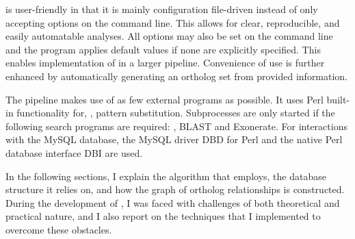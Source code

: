 \pname is user-friendly in that it is mainly configuration file-driven instead
of only accepting options on the command line. This allows for clear,
reproducible, and easily automatable analyses. All options may also be set on
the command line and the program applies default values if none are explicitly
specified. This enables implementation of \pname in a larger pipeline.
Convenience of use is further enhanced by automatically generating an ortholog
set from provided information.

The pipeline makes use of as few external programs as possible. It
uses Perl built-in functionality for, \eg, pattern substitution. Subprocesses
are only started if the following search programs are required: ,
BLAST and Exonerate. For interactions with the MySQL database, the MySQL driver
DBD for Perl and the native Perl database
interface DBI are used.

In the following sections, I explain the algorithm that \pname employs, the
database structure it relies on, and how the graph of ortholog relationships is
constructed. During the development of \pname, I was faced with challenges of
both theoretical and practical nature, and I also report on the techniques that
I implemented to overcome these obstacles.

